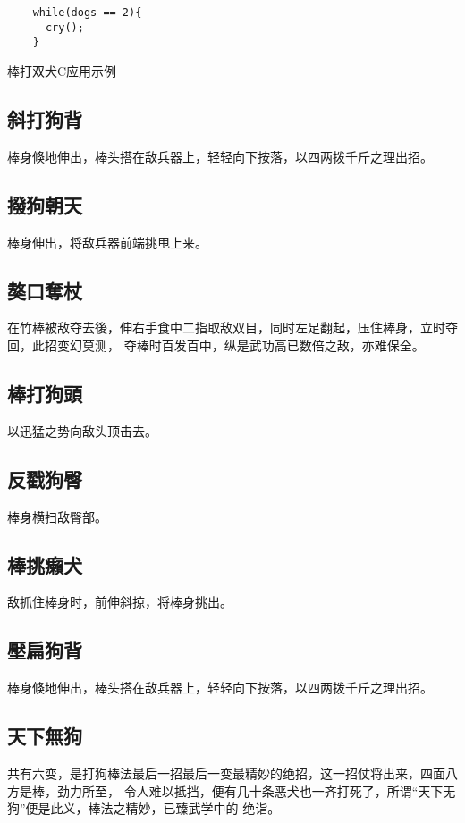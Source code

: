 \begin{listing}[H]
  \begin{verbatim}
    while(dogs == 2){
      cry();
    }
  \end{verbatim}
  \caption{棒打双犬C应用示例}
  \label{lst:cry}
\end{listing}

\subsection{斜打狗背}
棒身倏地伸出，棒头搭在敌兵器上，轻轻向下按落，以四两拨千斤之理出招。

\subsection{撥狗朝天}
棒身伸出，将敌兵器前端挑甩上来。

\subsection{獒口奪杖}
在竹棒被敌夺去後，伸右手食中二指取敌双目，同时左足翻起，压住棒身，立时夺回，此招变幻莫测，
夺棒时百发百中，纵是武功高已数倍之敌，亦难保全。　

\subsection{棒打狗頭}
以迅猛之势向敌头顶击去。

\subsection{反戳狗臀}
棒身横扫敌臀部。

\subsection{棒挑癩犬}
敌抓住棒身时，前伸斜掠，将棒身挑出。

\subsection{壓扁狗背}
棒身倏地伸出，棒头搭在敌兵器上，轻轻向下按落，以四两拨千斤之理出招。

\subsection{天下無狗}
共有六变，是打狗棒法最后一招最后一变最精妙的绝招，这一招仗将出来，四面八方是棒，劲力所至，
令人难以抵挡，便有几十条恶犬也一齐打死了，所谓“天下无狗”便是此义，棒法之精妙，已臻武学中的
绝诣。

